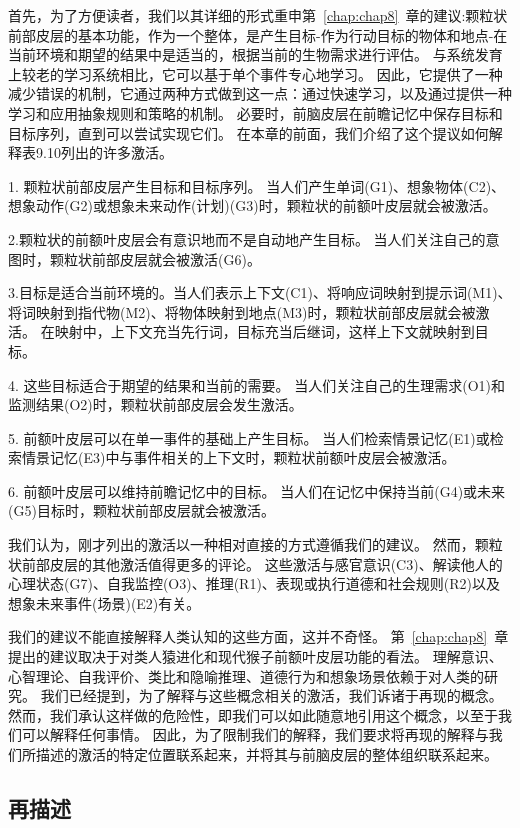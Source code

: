 首先，为了方便读者，我们以其详细的形式重申第~\ref{chap:chap8}~章的建议:颗粒状前部皮层的基本功能，作为一个整体，是产生目标-作为行动目标的物体和地点-在当前环境和期望的结果中是适当的，根据当前的生物需求进行评估。
与系统发育上较老的学习系统相比，它可以基于单个事件专心地学习。
因此，它提供了一种减少错误的机制，它通过两种方式做到这一点：通过快速学习，以及通过提供一种学习和应用抽象规则和策略的机制。
必要时，前脑皮层在前瞻记忆中保存目标和目标序列，直到可以尝试实现它们。
在本章的前面，我们介绍了这个提议如何解释表9.10列出的许多激活。


1. 颗粒状前部皮层产生目标和目标序列。
当人们产生单词(G1)、想象物体(C2)、想象动作(G2)或想象未来动作(计划)(G3)时，颗粒状的前额叶皮层就会被激活。


2.颗粒状的前额叶皮层会有意识地而不是自动地产生目标。
当人们关注自己的意图时，颗粒状前部皮层就会被激活(G6)。


3.目标是适合当前环境的。当人们表示上下文(C1)、将响应词映射到提示词(M1)、将词映射到指代物(M2)、将物体映射到地点(M3)时，颗粒状前部皮层就会被激活。
在映射中，上下文充当先行词，目标充当后继词，这样上下文就映射到目标。


4. 这些目标适合于期望的结果和当前的需要。
当人们关注自己的生理需求(O1)和监测结果(O2)时，颗粒状前部皮层会发生激活。


5. 前额叶皮层可以在单一事件的基础上产生目标。
当人们检索情景记忆(E1)或检索情景记忆(E3)中与事件相关的上下文时，颗粒状前额叶皮层会被激活。


6. 前额叶皮层可以维持前瞻记忆中的目标。
当人们在记忆中保持当前(G4)或未来(G5)目标时，颗粒状前部皮层就会被激活。


我们认为，刚才列出的激活以一种相对直接的方式遵循我们的建议。
然而，颗粒状前部皮层的其他激活值得更多的评论。
这些激活与感官意识(C3)、解读他人的心理状态(G7)、自我监控(O3)、推理(R1)、表现或执行道德和社会规则(R2)以及想象未来事件(场景)(E2)有关。


我们的建议不能直接解释人类认知的这些方面，这并不奇怪。
第~\ref{chap:chap8}~章提出的建议取决于对类人猿进化和现代猴子前额叶皮层功能的看法。
理解意识、心智理论、自我评价、类比和隐喻推理、道德行为和想象场景依赖于对人类的研究。
我们已经提到，为了解释与这些概念相关的激活，我们诉诸于再现的概念。
然而，我们承认这样做的危险性，即我们可以如此随意地引用这个概念，以至于我们可以解释任何事情。
因此，为了限制我们的解释，我们要求将再现的解释与我们所描述的激活的特定位置联系起来，并将其与前脑皮层的整体组织联系起来。



\subsection{再描述}

